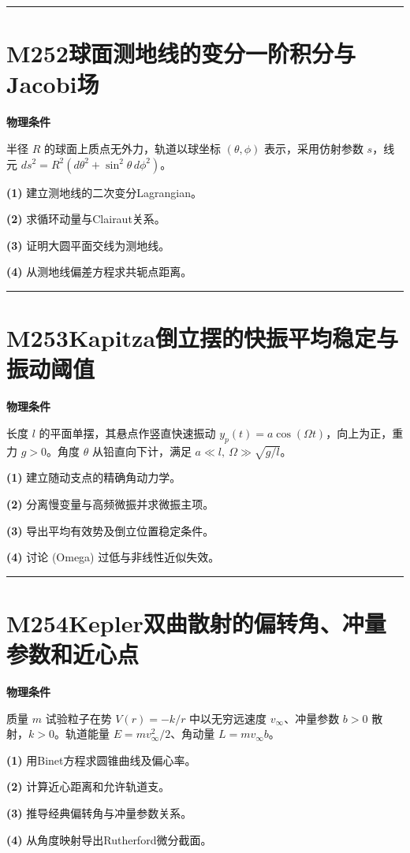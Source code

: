 \documentclass[UTF8,a4paper,11pt,oneside,openany]{ctexbook}
\begin{document}
\par\bigskip\hrule\bigskip
\section*{M252\quad 球面测地线的变分一阶积分与Jacobi场}
\textbf{物理条件}\par 半径 \(R\) 的球面上质点无外力，轨道以球坐标 \((\theta,\phi)\) 表示，采用仿射参数 \(s\)，线元 \(ds^2=R^2(d\theta^2+\sin^2\theta\,d\phi^2)\)。
\par\noindent\textbf{(1)} 建立测地线的二次变分Lagrangian。
\par\noindent\textbf{(2)} 求循环动量与Clairaut关系。
\par\noindent\textbf{(3)} 证明大圆平面交线为测地线。
\par\noindent\textbf{(4)} 从测地线偏差方程求共轭点距离。

\par\bigskip\hrule\bigskip
\section*{M253\quad Kapitza倒立摆的快振平均稳定与振动阈值}
\textbf{物理条件}\par 长度 \(l\) 的平面单摆，其悬点作竖直快速振动 \(y_p(t)=a\cos(\Omega t)\)，向上为正，重力 \(g>0\)。角度 \(\theta\) 从铅直向下计，满足 \(a\ll l,\ \Omega\gg\sqrt{g/l}\)。
\par\noindent\textbf{(1)} 建立随动支点的精确角动力学。
\par\noindent\textbf{(2)} 分离慢变量与高频微振并求微振主项。
\par\noindent\textbf{(3)} 导出平均有效势及倒立位置稳定条件。
\par\noindent\textbf{(4)} 讨论 (Omega) 过低与非线性近似失效。

\par\bigskip\hrule\bigskip
\section*{M254\quad Kepler双曲散射的偏转角、冲量参数和近心点}
\textbf{物理条件}\par 质量 \(m\) 试验粒子在势 \(V(r)=-k/r\) 中以无穷远速度 \(v_\infty\)、冲量参数 \(b>0\) 散射，\(k>0\)。轨道能量 \(E=m v_\infty^2/2\)、角动量 \(L=mv_\infty b\)。
\par\noindent\textbf{(1)} 用Binet方程求圆锥曲线及偏心率。
\par\noindent\textbf{(2)} 计算近心距离和允许轨道支。
\par\noindent\textbf{(3)} 推导经典偏转角与冲量参数关系。
\par\noindent\textbf{(4)} 从角度映射导出Rutherford微分截面。
\end{document}
